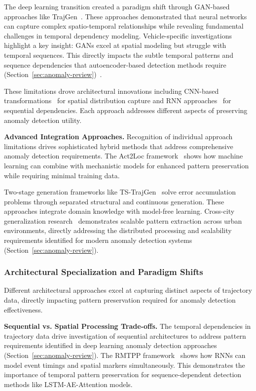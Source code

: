 \documentclass[runningheads]{llncs}
\begin{document}
The deep learning transition created a paradigm shift through GAN-based approaches like TrajGen~\cite{cao2021generating}. These approaches demonstrated that neural networks can capture complex spatio-temporal relationships while revealing fundamental challenges in temporal dependency modeling. Vehicle-specific investigations~\cite{bajarunas2022generative} highlight a key insight: GANs excel at spatial modeling but struggle with temporal sequences. This directly impacts the subtle temporal patterns and sequence dependencies that autoencoder-based detection methods require (Section~\ref{sec:anomaly-review})~\cite{huang2021lstm}.

These limitations drove architectural innovations including CNN-based transformations~\cite{merhi2024synthetic} for spatial distribution capture and RNN approaches~\cite{du2016recurrent} for sequential dependencies. Each approach addresses different aspects of preserving anomaly detection utility.

\textbf{Advanced Integration Approaches.} Recognition of individual approach limitations drives sophisticated hybrid methods that address comprehensive anomaly detection requirements. The Act2Loc framework~\cite{liu2023act2loc} shows how machine learning can combine with mechanistic models for enhanced pattern preservation while requiring minimal training data.

Two-stage generation frameworks like TS-TrajGen~\cite{jiang2023continuous} solve error accumulation problems through separated structural and continuous generation. These approaches integrate domain knowledge with model-free learning. Cross-city generalization research~\cite{wang2025gtg} demonstrates scalable pattern extraction across urban environments, directly addressing the distributed processing and scalability requirements identified for modern anomaly detection systems (Section~\ref{sec:anomaly-review}).

\subsubsection{Architectural Specialization and Paradigm Shifts}

Different architectural approaches excel at capturing distinct aspects of trajectory data, directly impacting pattern preservation required for anomaly detection effectiveness.

\textbf{Sequential vs. Spatial Processing Trade-offs.} The temporal dependencies in trajectory data drive investigation of sequential architectures to address pattern requirements identified in deep learning anomaly detection approaches (Section~\ref{sec:anomaly-review}). The RMTPP framework~\cite{du2016recurrent} shows how RNNs can model event timings and spatial markers simultaneously. This demonstrates the importance of temporal pattern preservation for sequence-dependent detection methods like LSTM-AE-Attention models.
\end{document}
